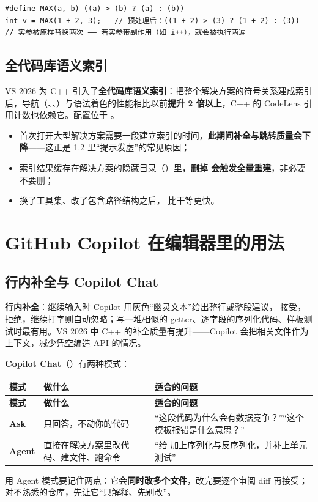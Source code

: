 \begin{lstlisting}[style=cppstyle]
#define MAX(a, b) ((a) > (b) ? (a) : (b))
int v = MAX(1 + 2, 3);   // 预处理后：((1 + 2) > (3) ? (1 + 2) : (3))
// 实参被原样替换两次 —— 若实参带副作用（如 i++），就会被执行两遍
\end{lstlisting}
\subsection{全代码库语义索引}

VS 2026 为 C++ 引入了\textbf{全代码库语义索引}：把整个解决方案的符号关系建成索引后，导航（、、）与语法着色的性能相比以前\textbf{提升 2 倍以上}，C++ 的 CodeLens 引用计数也依赖它。配置位于 。

\begin{itemize}
  \item 首次打开大型解决方案需要一段建立索引的时间，\textbf{此期间补全与跳转质量会下降}——这正是 1.2 里“提示发虚”的常见原因；
  \item 索引结果缓存在解决方案的隐藏目录（）里，\textbf{删掉  会触发全量重建}，非必要不要删；
  \item 换了工具集、改了包含路径结构之后， 比干等更快。
\end{itemize}

\section{GitHub Copilot 在编辑器里的用法}
\subsection{行内补全与 Copilot Chat}

\textbf{行内补全}：继续输入时 Copilot 用灰色“幽灵文本”给出整行或整段建议， 接受， 拒绝，继续打字则自动忽略；写一堆相似的 getter、逐字段的序列化代码、样板测试时最有用。VS 2026 中 C++ 的补全质量有提升——Copilot 会把相关文件作为上下文，减少凭空编造 API 的情况。

\textbf{Copilot Chat}（）有两种模式：

\begin{longtable}{L{2.2cm}L{5.0cm}L{7.0cm}}\toprule
\textbf{模式} & \textbf{做什么} & \textbf{适合的问题} \\ \midrule \endfirsthead
\toprule \textbf{模式} & \textbf{做什么} & \textbf{适合的问题} \\ \midrule \endhead \bottomrule \endlastfoot
\textbf{Ask} & 只回答，不动你的代码 & “这段代码为什么会有数据竞争？”“这个模板报错是什么意思？” \\
\textbf{Agent} & 直接在解决方案里改代码、建文件、跑命令 & “给  加上序列化与反序列化，并补上单元测试” \\
\end{longtable}
用 Agent 模式要记住两点：它会\textbf{同时改多个文件}，改完要逐个审阅 diff 再接受；对不熟悉的仓库，先让它“只解释、先别改”。

